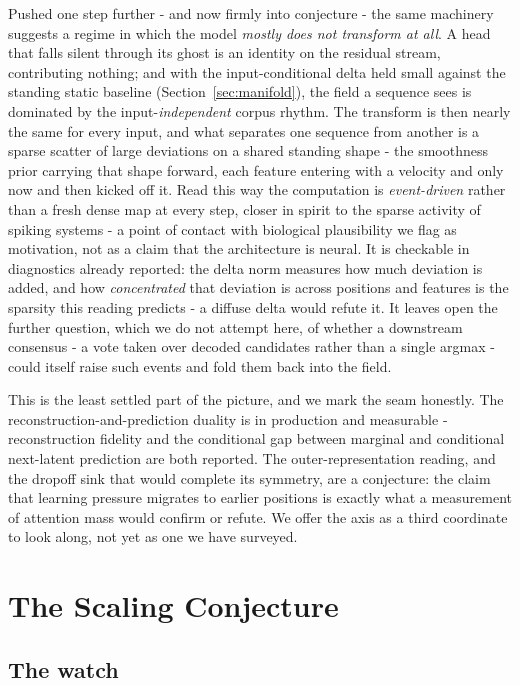Pushed one step further - and now firmly into conjecture - the same machinery suggests a regime in which the model \textit{mostly does not transform at all}. A head that falls silent through its ghost is an identity on the residual stream, contributing nothing; and with the input-conditional delta held small against the standing static baseline (Section~\ref{sec:manifold}), the field a sequence sees is dominated by the input-\textit{independent} corpus rhythm. The transform is then nearly the same for every input, and what separates one sequence from another is a sparse scatter of large deviations on a shared standing shape - the smoothness prior carrying that shape forward, each feature entering with a velocity and only now and then kicked off it. Read this way the computation is \textit{event-driven} rather than a fresh dense map at every step, closer in spirit to the sparse activity of spiking systems - a point of contact with biological plausibility we flag as motivation, not as a claim that the architecture is neural. It is checkable in diagnostics already reported: the delta norm measures how much deviation is added, and how \textit{concentrated} that deviation is across positions and features is the sparsity this reading predicts - a diffuse delta would refute it. It leaves open the further question, which we do not attempt here, of whether a downstream consensus - a vote taken over decoded candidates rather than a single argmax - could itself raise such events and fold them back into the field.

This is the least settled part of the picture, and we mark the seam honestly. The reconstruction-and-prediction duality is in production and measurable - reconstruction fidelity and the conditional gap between marginal and conditional next-latent prediction are both reported. The outer-representation reading, and the dropoff sink that would complete its symmetry, are a conjecture: the claim that learning pressure migrates to earlier positions is exactly what a measurement of attention mass would confirm or refute. We offer the axis as a third coordinate to look along, not yet as one we have surveyed.

\section{The Scaling Conjecture}
\label{sec:scaling}

\subsection{The watch}

